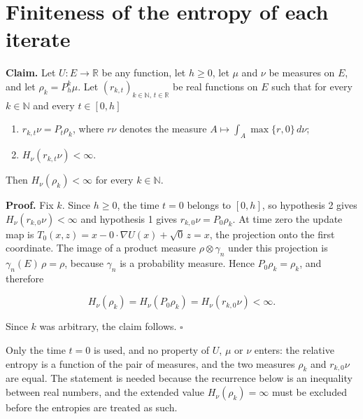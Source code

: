 \documentclass[11pt,a4paper]{article}
\begin{document}
\section{\texorpdfstring{Finiteness of the entropy of each iterate}{Finiteness of the entropy of each iterate}}


\textbf{Claim.} Let \(U:E\to\mathbb R\) be any function, let \(h\ge0\), let \(\mu\) and \(\nu\) be measures on \(E\), and let \(\rho_k=P_h^k\mu\). Let \((r_{k,t})_{k\in\mathbb N,\,t\in\mathbb R}\) be real functions on \(E\) such that for every \(k\in\mathbb N\) and every \(t\in[0,h]\)



\begin{enumerate}


\item \(r_{k,t}\nu=P_t\rho_k\), where \(r\nu\) denotes the measure \(A\mapsto\int_A\max\{r,0\}\,d\nu\);

\item \(H_\nu(r_{k,t}\nu)<\infty\).

\end{enumerate}



Then \(H_\nu(\rho_k)<\infty\) for every \(k\in\mathbb N\).




\textbf{Proof.} Fix \(k\). Since \(h\ge0\), the time \(t=0\) belongs to \([0,h]\), so hypothesis 2 gives \(H_\nu(r_{k,0}\nu)<\infty\) and hypothesis 1 gives \(r_{k,0}\nu=P_0\rho_k\). At time zero the update map is \(T_0(x,z)=x-0\cdot\nabla U(x)+\sqrt0\,z=x\), the projection onto the first coordinate. The image of a product measure \(\rho\otimes\gamma_n\) under this projection is \(\gamma_n(E)\,\rho=\rho\), because \(\gamma_n\) is a probability measure. Hence \(P_0\rho_k=\rho_k\), and therefore


\[H_\nu(\rho_k)=H_\nu(P_0\rho_k)=H_\nu(r_{k,0}\nu)<\infty.\]


Since \(k\) was arbitrary, the claim follows. \(\square\)




Only the time \(t=0\) is used, and no property of \(U\), \(\mu\) or \(\nu\) enters: the relative entropy is a function of the pair of measures, and the two measures \(\rho_k\) and \(r_{k,0}\nu\) are equal. The statement is needed because the recurrence below is an inequality between real numbers, and the extended value \(H_\nu(\rho_k)=\infty\) must be excluded before the entropies are treated as such.
\end{document}
